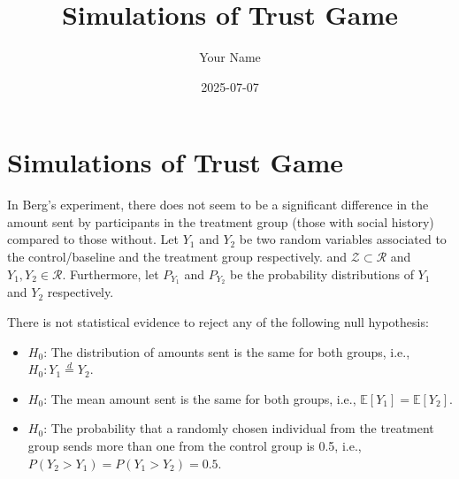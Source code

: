 \documentclass[
]{article}
\title{Simulations of Trust Game}
\author{Your Name}
\date{2025-07-07}
\providecommand{\tightlist}{%
  \setlength{\itemsep}{0pt}\setlength{\parskip}{0pt}}
\begin{document}
\maketitle

\section{Simulations of Trust Game}\label{simulations-of-trust-game}

In Berg's experiment, there does not seem to be a significant difference
in the amount sent by participants in the treatment group (those with
social history) compared to those without. Let \(Y_{1}\) and \(Y_{2}\)
be two random variables associated to the control/baseline and the
treatment group respectively. and \(\mathcal{Z} \subset  \mathcal{R}\)
and \(Y_{1}, Y_{2} \in \mathcal{R}\). Furthermore, let \(P_{Y_{1}}\) and
\(P_{Y_{2}}\) be the probability distributions of \(Y_{1}\) and
\(Y_{2}\) respectively.

There is not statistical evidence to reject any of the following null
hypothesis:

\begin{itemize}
\tightlist
\item
  \(H_0\): The distribution of amounts sent is the same for both groups,
  i.e., \(H_{0}: Y_1 \overset{d}{=} Y_{2}\).
\item
  \(H_0\): The mean amount sent is the same for both groups, i.e.,
  \(\mathbb{E}[Y_{1}] = \mathbb{E}[Y_{2}]\).
\item
  \(H_0\): The probability that a randomly chosen individual from the
  treatment group sends more than one from the control group is 0.5,
  i.e., \(P(Y_{2} > Y_{1}) = P(Y_{1} > Y_{2}) = 0.5\).
\end{itemize}
\end{document}
